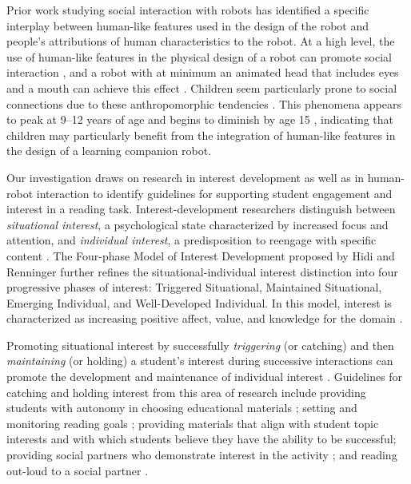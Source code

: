 \documentclass{sigchi}
\begin{document}
Prior work studying social interaction with robots has identified a specific interplay between human-like features used in the design of the robot and people's attributions of human characteristics to the robot. At a high level, the use of human-like features in the physical design of a robot can promote social interaction \cite{Duffy:2003}, and a robot with at minimum an animated head that includes eyes and a mouth can achieve this effect \cite{Martini:2015}. Children seem particularly prone to social connections due to these anthropomorphic tendencies \cite{Tung:2016}. This phenomena appears to peak at 9--12 years of age and begins to diminish by age 15 \cite{Kahn:2012}, indicating that children may particularly benefit from the integration of human-like features in the design of a learning companion robot.

Our investigation draws on research in interest development as well as in human-robot interaction to identify guidelines for supporting student engagement and interest in a reading task. Interest-development researchers distinguish between \textit{situational interest}, a psychological state characterized by increased focus and attention, and \textit{individual interest}, a predisposition to reengage with specific content \cite{Krapp:1999}. The Four-phase Model of Interest Development proposed by Hidi and Renninger \cite{Hidi:2006} further refines the situational-individual interest distinction into four progressive phases of interest: Triggered Situational, Maintained Situational, Emerging Individual, and Well-Developed Individual. In this model, interest is characterized as increasing positive affect, value, and knowledge for the domain \cite{Renninger:2011}.

Promoting situational interest by successfully \textit{triggering} (or catching) and then \textit{maintaining} (or holding) a student's interest during successive interactions can promote the development and maintenance of individual interest \cite{Hidi:2006, Mitchell:1993}. Guidelines for catching and holding interest from this area of research include providing students with autonomy in choosing educational materials \cite{Jones:2011}; setting and monitoring reading goals \cite{Cabral:2015}; providing materials that align with student topic interests \cite{Ainley:2002} and with which students believe they have the ability to be successful; providing social partners who demonstrate interest in the activity \cite{Sansone:2005}; and reading out-loud to a social partner \cite{Rasinski:2003}. 
\end{document}
